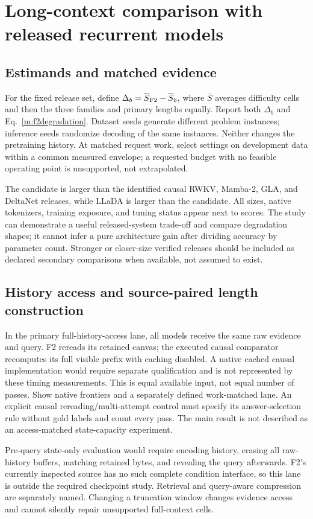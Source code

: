 \documentclass{article}
\theoremstyle{remark}\newtheorem{remark}[theorem]{Remark}
\begin{document}
\section{Long-context comparison with released recurrent models}
\label{app:longcomparison}
\subsection{Estimands and matched evidence}
For the fixed release set, define $\Delta_b=\overline S_{\rm F2}-\overline S_b$, where $\overline S$ averages difficulty cells and then the three families and primary lengths equally. Report both $\Delta_b$ and Eq.~\eqref{m:f2degradation}. Dataset seeds generate different problem instances; inference seeds randomize decoding of the same instances. Neither changes the pretraining history. At matched request work, select settings on development data within a common measured envelope; a requested budget with no feasible operating point is unsupported, not extrapolated.

The candidate is larger than the identified causal RWKV, Mamba-2, GLA, and DeltaNet releases, while LLaDA is larger than the candidate. All sizes, native tokenizers, training exposure, and tuning status appear next to scores. The study can demonstrate a useful released-system trade-off and compare degradation shapes; it cannot infer a pure architecture gain after dividing accuracy by parameter count. Stronger or closer-size verified releases should be included as declared secondary comparisons when available, not assumed to exist.

\subsection{History access and source-paired length construction}
In the primary full-history-access lane, all models receive the same raw evidence and query. F2 rereads its retained canvas; the executed causal comparator recomputes its full visible prefix with caching disabled. A native cached causal implementation would require separate qualification and is not represented by these timing measurements. This is equal available input, not equal number of passes. Show native frontiers and a separately defined work-matched lane. An explicit causal rereading/multi-attempt control must specify its answer-selection rule without gold labels and count every pass. The main result is not described as an access-matched state-capacity experiment.

Pre-query state-only evaluation would require encoding history, erasing all raw-history buffers, matching retained bytes, and revealing the query afterwards. F2's currently inspected source has no such complete condition interface, so this lane is outside the required checkpoint study. Retrieval and query-aware compression are separately named. Changing a truncation window changes evidence access and cannot silently repair unsupported full-context cells.
\end{document}
